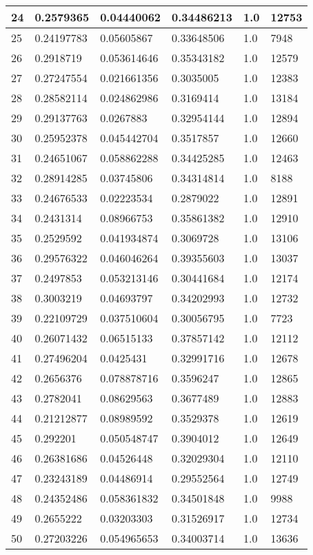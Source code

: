 \begin{longtable}{|l|l|l|l|l|l|}
24 & 0.2579365 & 0.04440062 & 0.34486213 & 1.0 & 12753 \\ \hline 
25 & 0.24197783 & 0.05605867 & 0.33648506 & 1.0 & 7948 \\ \hline 
26 & 0.2918719 & 0.053614646 & 0.35343182 & 1.0 & 12579 \\ \hline 
27 & 0.27247554 & 0.021661356 & 0.3035005 & 1.0 & 12383 \\ \hline 
28 & 0.28582114 & 0.024862986 & 0.3169414 & 1.0 & 13184 \\ \hline 
29 & 0.29137763 & 0.0267883 & 0.32954144 & 1.0 & 12894 \\ \hline 
30 & 0.25952378 & 0.045442704 & 0.3517857 & 1.0 & 12660 \\ \hline 
31 & 0.24651067 & 0.058862288 & 0.34425285 & 1.0 & 12463 \\ \hline 
32 & 0.28914285 & 0.03745806 & 0.34314814 & 1.0 & 8188 \\ \hline 
33 & 0.24676533 & 0.02223534 & 0.2879022 & 1.0 & 12891 \\ \hline 
34 & 0.2431314 & 0.08966753 & 0.35861382 & 1.0 & 12910 \\ \hline 
35 & 0.2529592 & 0.041934874 & 0.3069728 & 1.0 & 13106 \\ \hline 
36 & 0.29576322 & 0.046046264 & 0.39355603 & 1.0 & 13037 \\ \hline 
37 & 0.2497853 & 0.053213146 & 0.30441684 & 1.0 & 12174 \\ \hline 
38 & 0.3003219 & 0.04693797 & 0.34202993 & 1.0 & 12732 \\ \hline 
39 & 0.22109729 & 0.037510604 & 0.30056795 & 1.0 & 7723 \\ \hline 
40 & 0.26071432 & 0.06515133 & 0.37857142 & 1.0 & 12112 \\ \hline 
41 & 0.27496204 & 0.0425431 & 0.32991716 & 1.0 & 12678 \\ \hline 
42 & 0.2656376 & 0.078878716 & 0.3596247 & 1.0 & 12865 \\ \hline 
43 & 0.2782041 & 0.08629563 & 0.3677489 & 1.0 & 12883 \\ \hline 
44 & 0.21212877 & 0.08989592 & 0.3529378 & 1.0 & 12619 \\ \hline 
45 & 0.292201 & 0.050548747 & 0.3904012 & 1.0 & 12649 \\ \hline 
46 & 0.26381686 & 0.04526448 & 0.32029304 & 1.0 & 12110 \\ \hline 
47 & 0.23243189 & 0.04486914 & 0.29552564 & 1.0 & 12749 \\ \hline 
48 & 0.24352486 & 0.058361832 & 0.34501848 & 1.0 & 9988 \\ \hline 
49 & 0.2655222 & 0.03203303 & 0.31526917 & 1.0 & 12734 \\ \hline 
50 & 0.27203226 & 0.054965653 & 0.34003714 & 1.0 & 13636 \\ \hline 
\end{longtable}